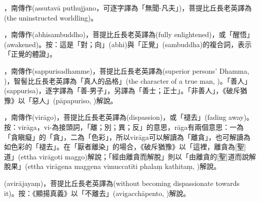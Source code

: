 \startitemgroup[noteitems]
\item{}，南傳作(assutavā puthujjano，可逐字譯為「無聞-凡夫」)，菩提比丘長老英譯為(the uninstructed worldling)。
\stopitemgroup

\startitemgroup[noteitems]
\item{}，南傳作(abhisambuddho)，菩提比丘長老英譯為(fully enlightened)，或「醒悟」(awakened)。按：這是「對；向」(abhi)與「正覺」(sambuddha)的複合詞，表示「正覺的體證」。
\stopitemgroup

\startitemgroup[noteitems]
\item{}，南傳作(sappurisadhamme)，菩提比丘長老英譯為(superior persons' Dhamma, )，智髻比丘長老英譯為「真人的品格」(the character of a true man, )。「善人」(sappurisa)，逐字譯為「善-男子」，另譯為「善士；正士」。「非善人」，《破斥猶豫》以「惡人」(pāpapuriso, )解說。
\stopitemgroup

\startitemgroup[noteitems]
\item{}，南傳作(virāgo)，菩提比丘長老英譯為(dispassion)，或「褪去」(fading away)。按：virāga，vi-為接頭詞，「離；別；異；反」的意思，rāga有兩個意思：一為「貪瞋癡」的「貪」，二為「色彩」，所以virāga可以解讀為「離貪」，也可解讀為如色彩的「褪去」。在「厭者離染」的場合，《破斥猶豫》以「這裡，離貪為[聖]道」(ettha virāgoti maggo)解說；「經由離貪而解脫」則以「由離貪的[聖]道而說解脫果」(ettha virāgena maggena vimuccatīti phalaṃ kathitaṃ, )解說。
\item{}(avirājayaṃ)，菩提比丘長老英譯為(without becoming dispassionate towards it)。按：《顯揚真義》以「不離去」(avigacchāpento, )解說。
\stopitemgroup

